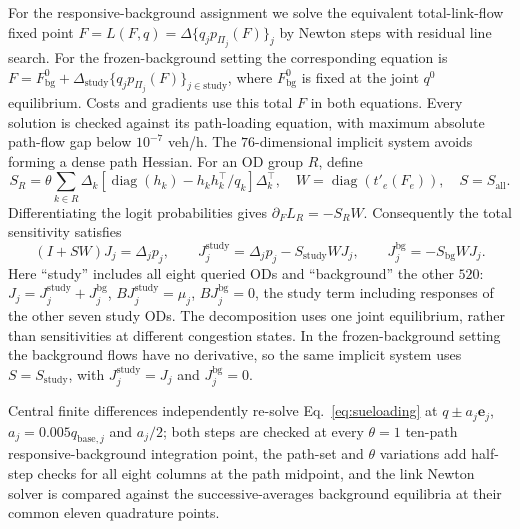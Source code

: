 For the responsive-background assignment we solve the equivalent total-link-flow fixed
point $F=L(F,q)=\Delta\{q_jp_{\Pi_j}(F)\}_j$ by Newton steps with residual
line search. For the frozen-background setting the corresponding equation is
$F=F_{\mathrm{bg}}^0+\Delta_{\mathrm{study}}
\{q_jp_{\Pi_j}(F)\}_{j\in\mathrm{study}}$, where $F_{\mathrm{bg}}^0$
is fixed at the joint $q^0$ equilibrium. Costs and gradients use this
total $F$ in both equations. Every solution is checked against its path-loading
equation, with maximum absolute path-flow gap below $10^{-7}$ veh/h.
The $76$-dimensional implicit system avoids forming a dense path Hessian.
For an OD group $R$, define
\[
S_R=\theta\sum_{k\in R}\Delta_k
\left[\operatorname{diag}(h_k)-h_kh_k^\top/q_k\right]\Delta_k^\top,
\quad W=\operatorname{diag}(t'_e(F_e)),\quad S=S_{\mathrm{all}}.
\]
Differentiating the logit probabilities gives
$\partial_F L_R=-S_RW$. Consequently the total sensitivity satisfies
\begin{equation}
(I+SW)J_j=\Delta_jp_j,\qquad
J_j^{\mathrm{study}}=\Delta_jp_j-S_{\mathrm{study}}WJ_j,\qquad
J_j^{\mathrm{bg}}=-S_{\mathrm{bg}}WJ_j.
\label{eq:bg_sensitivity}
\end{equation}
Here ``study'' includes all eight queried ODs and ``background'' the
other $520$: $J_j=J_j^{\mathrm{study}}+J_j^{\mathrm{bg}}$,
$BJ_j^{\mathrm{study}}=\mu_j$, $BJ_j^{\mathrm{bg}}=0$, the study
term including responses of the other seven study ODs. The
decomposition uses one joint equilibrium, rather than sensitivities
at different congestion states.
In the frozen-background setting the background flows have no
derivative, so the same
implicit system uses $S=S_{\mathrm{study}}$, with
$J_j^{\mathrm{study}}=J_j$ and $J_j^{\mathrm{bg}}=0$.

Central finite differences independently re-solve Eq.~\eqref{eq:sueloading}
at $q\pm a_j\mathbf e_j$, $a_j=0.005q_{\mathrm{base},j}$ and
$a_j/2$; both steps are checked at every $\theta=1$ ten-path
responsive-background integration point, the path-set and $\theta$ variations
add half-step checks for all eight columns at the path midpoint, and
the link Newton solver is compared against the successive-averages
background equilibria at their common eleven quadrature points.


